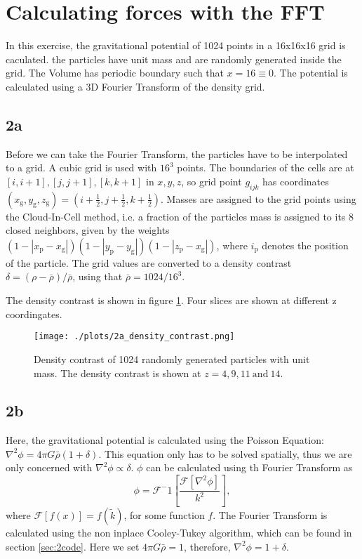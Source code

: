 \section{Calculating forces with the FFT}
In this exercise, the gravitational potential of 1024 points in a 16x16x16 grid is caculated. the particles have unit mass and are randomly generated inside the grid. The Volume has periodic boundary such that $x = 16 \equiv 0$. The potential is calculated using a 3D Fourier Transform of the density grid. 

\subsection*{2a}
Before we can take the Fourier Transform, the particles have to be interpolated to a grid. A cubic grid is used with $16^3$ points. The boundaries of the cells are at $[i, i+1], [j, j+1], [k, k+1]$ in $x,y,z$, so grid point $g_{ijk}$ has coordinates $(x_\mathrm{g},y_\mathrm{g},z_\mathrm{g}) = \left(i+\frac{1}{2},j+\frac{1}{2},k+\frac{1}{2}\right)$. Masses are assigned to the grid points using the Cloud-In-Cell method, i.e. a fraction of the particles mass is assigned to its 8 closed neighbors, given by the weights
$(1-\left\vert x_\mathrm{p} -x_\mathrm{g} \right\vert)(1-\left\vert y_\mathrm{p} -y_\mathrm{g} \right\vert)(1-\left\vert z_\mathrm{p} -x_\mathrm{g} \right\vert)$, where $i_\mathrm{p}$ denotes the position of the particle. The grid values are converted to a density contrast $\delta = (\rho - \bar{\rho})/\bar{\rho}$, using that $\bar{\rho}= 1024/16^3$.

The density contrast is shown in figure \ref{fig:2a}. Four slices are shown at different z coordingates. 

\begin{figure}[h]
    \centering
    \texttt{[image: ./plots/2a\_density\_contrast.png]}
    \caption{Density contrast of 1024 randomly generated particles with unit mass. The density contrast is shown at $z=4,9,11 \ \mathrm{and}\  14$.}
    \label{fig:2a}
\end{figure}

\subsection*{2b}
Here, the gravitational potential is calculated using the Poisson Equation: $\nabla^2\phi = 4\pi G\bar{\rho}(1+\delta)$. This equation only has to be solved spatially, thus we are only concerned with $\nabla^2\phi \propto \delta$. $\phi$ can be calculated using th Fourier Transform as 
\begin{equation}
    \phi = \mathcal{F}^-1\left[ \frac{\mathcal{F}\left[\nabla^2 \phi \right]}{k^2} \right],
\end{equation}
where $\mathcal{F}\left[f(x)\right] = f(\widetilde{k})$, for some function $f$. The Fourier Transform is calculated using the non inplace Cooley-Tukey algorithm, which can be found in section \ref{sec:2code}. Here we set $4\pi G \bar{\rho} = 1$, therefore, $\nabla^2 \phi = 1 + \delta$.

